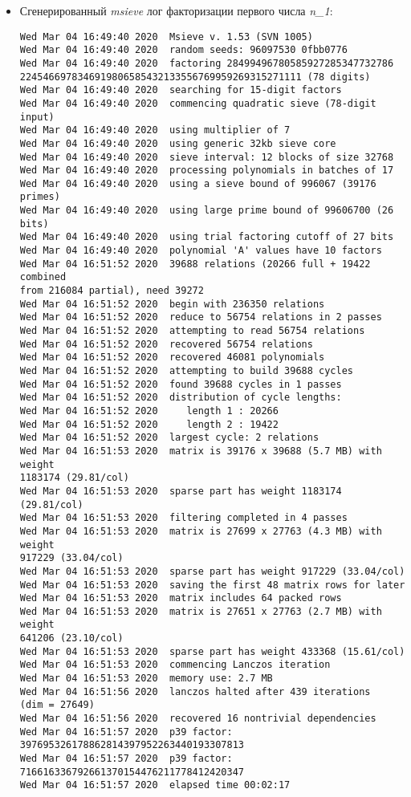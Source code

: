 \documentclass[12pt]{article}
\begin{document}
\begin{itemize}
    \item Сгенерированный \textit{msieve} лог факторизации первого числа \textit{n_1}:
    
\begin{lstlisting}
Wed Mar 04 16:49:40 2020  Msieve v. 1.53 (SVN 1005)
Wed Mar 04 16:49:40 2020  random seeds: 96097530 0fbb0776
Wed Mar 04 16:49:40 2020  factoring 28499496780585927285347732786
2245466978346919806585432133556769959269315271111 (78 digits)
Wed Mar 04 16:49:40 2020  searching for 15-digit factors
Wed Mar 04 16:49:40 2020  commencing quadratic sieve (78-digit input)
Wed Mar 04 16:49:40 2020  using multiplier of 7
Wed Mar 04 16:49:40 2020  using generic 32kb sieve core
Wed Mar 04 16:49:40 2020  sieve interval: 12 blocks of size 32768
Wed Mar 04 16:49:40 2020  processing polynomials in batches of 17
Wed Mar 04 16:49:40 2020  using a sieve bound of 996067 (39176 primes)
Wed Mar 04 16:49:40 2020  using large prime bound of 99606700 (26 bits)
Wed Mar 04 16:49:40 2020  using trial factoring cutoff of 27 bits
Wed Mar 04 16:49:40 2020  polynomial 'A' values have 10 factors
Wed Mar 04 16:51:52 2020  39688 relations (20266 full + 19422 combined
from 216084 partial), need 39272
Wed Mar 04 16:51:52 2020  begin with 236350 relations
Wed Mar 04 16:51:52 2020  reduce to 56754 relations in 2 passes
Wed Mar 04 16:51:52 2020  attempting to read 56754 relations
Wed Mar 04 16:51:52 2020  recovered 56754 relations
Wed Mar 04 16:51:52 2020  recovered 46081 polynomials
Wed Mar 04 16:51:52 2020  attempting to build 39688 cycles
Wed Mar 04 16:51:52 2020  found 39688 cycles in 1 passes
Wed Mar 04 16:51:52 2020  distribution of cycle lengths:
Wed Mar 04 16:51:52 2020     length 1 : 20266
Wed Mar 04 16:51:52 2020     length 2 : 19422
Wed Mar 04 16:51:52 2020  largest cycle: 2 relations
Wed Mar 04 16:51:53 2020  matrix is 39176 x 39688 (5.7 MB) with weight
1183174 (29.81/col)
Wed Mar 04 16:51:53 2020  sparse part has weight 1183174 (29.81/col)
Wed Mar 04 16:51:53 2020  filtering completed in 4 passes
Wed Mar 04 16:51:53 2020  matrix is 27699 x 27763 (4.3 MB) with weight
917229 (33.04/col)
Wed Mar 04 16:51:53 2020  sparse part has weight 917229 (33.04/col)
Wed Mar 04 16:51:53 2020  saving the first 48 matrix rows for later
Wed Mar 04 16:51:53 2020  matrix includes 64 packed rows
Wed Mar 04 16:51:53 2020  matrix is 27651 x 27763 (2.7 MB) with weight
641206 (23.10/col)
Wed Mar 04 16:51:53 2020  sparse part has weight 433368 (15.61/col)
Wed Mar 04 16:51:53 2020  commencing Lanczos iteration
Wed Mar 04 16:51:53 2020  memory use: 2.7 MB
Wed Mar 04 16:51:56 2020  lanczos halted after 439 iterations
(dim = 27649)
Wed Mar 04 16:51:56 2020  recovered 16 nontrivial dependencies
Wed Mar 04 16:51:57 2020  p39 factor:
397695326178862814397952263440193307813
Wed Mar 04 16:51:57 2020  p39 factor:
716616336792661370154476211778412420347
Wed Mar 04 16:51:57 2020  elapsed time 00:02:17
\end{lstlisting}


\end{itemize}
\end{document}
